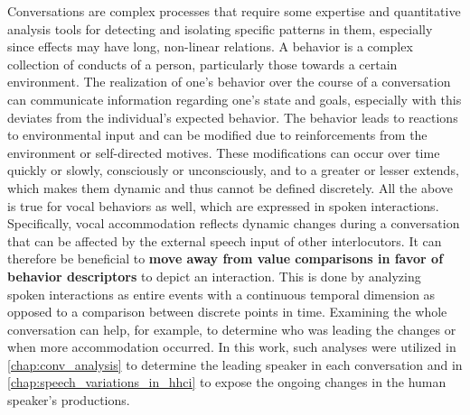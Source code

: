 Conversations are complex processes that require some expertise and quantitative analysis tools for detecting and isolating specific patterns in them, especially since effects may have long, non-linear relations.
A behavior is a complex collection of conducts of a person, particularly those towards a certain environment.
The realization of one's behavior over the course of a conversation can communicate information regarding one's state and goals, especially with this deviates from the individual's expected behavior.
The behavior leads to reactions to environmental input and can be modified due to reinforcements from the environment or self-directed motives.
These modifications can occur over time quickly or slowly, consciously or unconsciously, and to a greater or lesser extends, which makes them dynamic and thus cannot be defined discretely.
All the above is true for vocal behaviors as well, which are expressed in spoken interactions.
Specifically, vocal accommodation reflects dynamic changes during a conversation that can be affected by the external speech input of other interlocutors.
It can therefore be beneficial to \textbf{move away from value comparisons in favor of behavior descriptors} to depict an interaction.
This is done by analyzing spoken interactions as entire events with a continuous temporal dimension as opposed to a comparison between discrete points in time.
Examining the whole conversation can help, for example, to determine who was leading the changes or when more accommodation occurred.
In this work, such analyses were utilized in \cref{chap:conv_analysis} to determine the leading speaker in each conversation and in \cref{chap:speech_variations_in_hhci} to expose the ongoing changes in the human speaker's productions.

